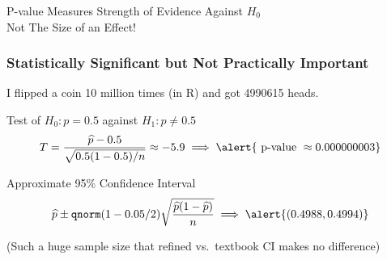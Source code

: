 \documentclass{beamer}
\begin{document}
\begin{frame}
\begin{center}
\Huge P-value Measures Strength of Evidence Against $H_0$\\ \alert{Not The Size of an Effect!}
\end{center}
\end{frame}
\begin{frame}
\frametitle{Statistically Significant but Not Practically Important}
\small
I flipped a coin 10 million times (in R) and got 4990615 heads.
\begin{block}{Test of $H_0\colon p = 0.5$ against $H_1\colon p \neq 0.5$}
$$T = \displaystyle \frac{\widehat{p} - 0.5}{\sqrt{0.5(1-0.5)/n}} \approx -5.9   \implies \alert{\mbox{ p-value } \approx 0.000000003}$$
\end{block}

\begin{block}{Approximate 95\% Confidence Interval}
 $$\widehat{p} \pm \texttt{qnorm}(1 - 0.05/2) \sqrt{\frac{\widehat{p}(1-\widehat{p})}{n}}  \implies \alert{(0.4988, 0.4994)}$$
\end{block}

\footnotesize (Such a huge sample size that refined vs.\ textbook CI makes no difference)
\large
\vspace{1em}

\alert{}
\end{frame}

\end{document}
